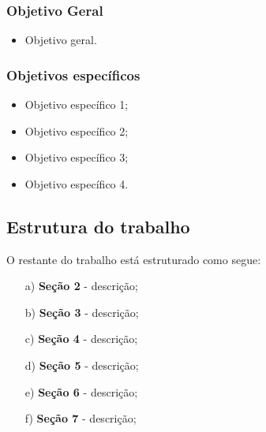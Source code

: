 \subsubsection*{Objetivo Geral}

\begin{itemize}
	\item Objetivo geral.
\end{itemize}

\subsubsection*{Objetivos específicos}
\begin{itemize}
\item Objetivo específico 1;
\item Objetivo específico 2;
\item Objetivo específico 3;
\item Objetivo específico 4.
\end{itemize}

\subsection*{Estrutura do trabalho}

O restante do trabalho está estruturado como segue:

\begin{enumerate}
\item[a)] \textbf{Seção 2} - descrição;
\item[b)] \textbf{Seção 3} - descrição;
\item[c)] \textbf{Seção 4} - descrição;
\item[d)] \textbf{Seção 5} - descrição;
\item[e)] \textbf{Seção 6} - descrição;
\item[f)] \textbf{Seção 7} - descrição;
\end{enumerate}
